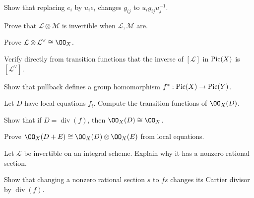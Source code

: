 \begin{exercise}\label{exr:vi42-03}
Show that replacing \(e_i\) by \(u_i e_i\) changes \(g_{ij}\) to \(u_i g_{ij}u_j^{-1}\).
\end{exercise}

\begin{exercise}\label{exr:vi42-04}
Prove that \(\mathcal L\otimes\mathcal M\) is invertible when \(\mathcal L,\mathcal M\) are.
\end{exercise}

\begin{exercise}\label{exr:vi42-05}
Prove \(\mathcal L\otimes\mathcal L^\vee\cong\OO_X\).
\end{exercise}

\begin{exercise}\label{exr:vi42-06}
Verify directly from transition functions that the inverse of \([\mathcal L]\) in \(\operatorname{Pic}(X)\) is \([\mathcal L^\vee]\).
\end{exercise}

\begin{exercise}\label{exr:vi42-07}
Show that pullback defines a group homomorphism \(f^*:\operatorname{Pic}(X)\to\operatorname{Pic}(Y)\).
\end{exercise}

\begin{exercise}\label{exr:vi42-08}
Let \(D\) have local equations \(f_i\).  Compute the transition functions of \(\OO_X(D)\).
\end{exercise}

\begin{exercise}\label{exr:vi42-09}
Show that if \(D=\operatorname{div}(f)\), then \(\OO_X(D)\cong\OO_X\).
\end{exercise}

\begin{exercise}\label{exr:vi42-10}
Prove \(\OO_X(D+E)\cong\OO_X(D)\otimes\OO_X(E)\) from local equations.
\end{exercise}

\begin{exercise}\label{exr:vi42-11}
Let \(\mathcal L\) be invertible on an integral scheme.  Explain why it has a nonzero rational section.
\end{exercise}

\begin{exercise}\label{exr:vi42-12}
Show that changing a nonzero rational section \(s\) to \(fs\) changes its Cartier divisor by \(\operatorname{div}(f)\).
\end{exercise}

